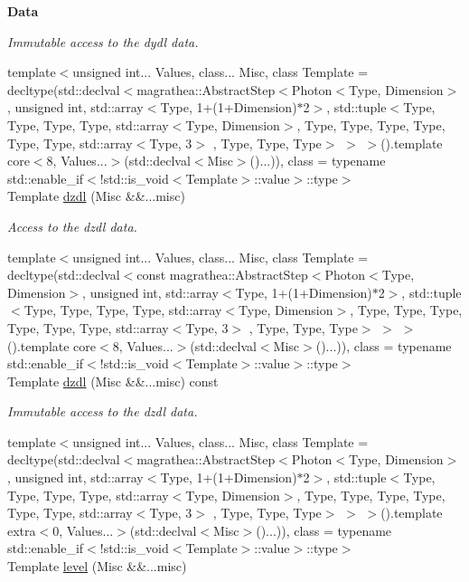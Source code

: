 \begin{Indent}{\bf Data}
\begin{DoxyCompactItemize}
\begin{DoxyCompactList}\small\item\em Immutable access to the dydl data. \end{DoxyCompactList}\item 
{\footnotesize template$<$unsigned int... Values, class... Misc, class Template  = decltype(std\-::declval$<$magrathea\-::\-Abstract\-Step$<$\-Photon$<$\-Type, Dimension$>$, unsigned int, std\-::array$<$\-Type, 1+(1+\-Dimension)$\ast$2$>$, std\-::tuple$<$\-Type, Type, Type, Type, std\-::array$<$\-Type, Dimension$>$, Type, Type, Type, Type, Type, Type, std\-::array$<$\-Type, 3$>$ , Type, Type, Type$>$ $>$ $>$().\-template core$<$8, Values...$>$(std\-::declval$<$\-Misc$>$()...)), class  = typename std\-::enable\-\_\-if$<$!std\-::is\-\_\-void$<$\-Template$>$\-::value$>$\-::type$>$ }\\Template \hyperlink{exceptionPhoton_a449a164994ecfdd2fbac12f0c50acece}{dzdl} (Misc \&\&...misc)
\begin{DoxyCompactList}\small\item\em Access to the dzdl data. \end{DoxyCompactList}\item 
{\footnotesize template$<$unsigned int... Values, class... Misc, class Template  = decltype(std\-::declval$<$const magrathea\-::\-Abstract\-Step$<$\-Photon$<$\-Type, Dimension$>$, unsigned int, std\-::array$<$\-Type, 1+(1+\-Dimension)$\ast$2$>$, std\-::tuple$<$\-Type, Type, Type, Type, std\-::array$<$\-Type, Dimension$>$, Type, Type, Type, Type, Type, Type, std\-::array$<$\-Type, 3$>$ , Type, Type, Type$>$ $>$ $>$().\-template core$<$8, Values...$>$(std\-::declval$<$\-Misc$>$()...)), class  = typename std\-::enable\-\_\-if$<$!std\-::is\-\_\-void$<$\-Template$>$\-::value$>$\-::type$>$ }\\Template \hyperlink{exceptionPhoton_ab68fdfa019d0c9e2fe15437a8c1d0ca3}{dzdl} (Misc \&\&...misc) const 
\begin{DoxyCompactList}\small\item\em Immutable access to the dzdl data. \end{DoxyCompactList}\item 
{\footnotesize template$<$unsigned int... Values, class... Misc, class Template  = decltype(std\-::declval$<$magrathea\-::\-Abstract\-Step$<$\-Photon$<$\-Type, Dimension$>$, unsigned int, std\-::array$<$\-Type, 1+(1+\-Dimension)$\ast$2$>$, std\-::tuple$<$\-Type, Type, Type, Type, std\-::array$<$\-Type, Dimension$>$, Type, Type, Type, Type, Type, Type, std\-::array$<$\-Type, 3$>$ , Type, Type, Type$>$ $>$ $>$().\-template extra$<$0, Values...$>$(std\-::declval$<$\-Misc$>$()...)), class  = typename std\-::enable\-\_\-if$<$!std\-::is\-\_\-void$<$\-Template$>$\-::value$>$\-::type$>$ }\\Template \hyperlink{exceptionPhoton_a1181b3a7962f3eaa951a359d1cd8357d}{level} (Misc \&\&...misc)

\end{DoxyCompactItemize}
\end{Indent}
